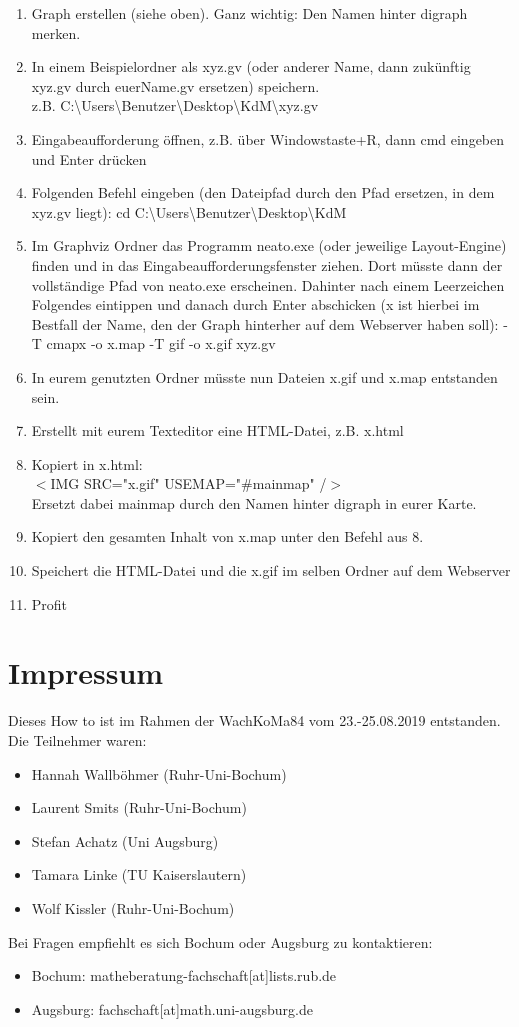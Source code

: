 \documentclass{article}
\begin{document}
\begin{enumerate}
\item Graph erstellen (siehe oben). Ganz wichtig: Den Namen hinter digraph merken.
\item In einem Beispielordner als xyz.gv (oder anderer Name, dann zukünftig xyz.gv durch euerName.gv ersetzen) speichern.\\
z.B. C:\textbackslash Users\textbackslash Benutzer\textbackslash Desktop\textbackslash KdM\textbackslash xyz.gv
\item Eingabeaufforderung öffnen, z.B. über Windowstaste+R, dann cmd eingeben und Enter drücken
\item Folgenden Befehl eingeben (den Dateipfad durch den Pfad ersetzen, in dem xyz.gv liegt): cd C:\textbackslash Users\textbackslash Benutzer\textbackslash Desktop\textbackslash KdM
\item Im Graphviz Ordner das Programm neato.exe (oder jeweilige Layout-Engine) finden und in das Eingabeaufforderungsfenster ziehen. Dort müsste dann der vollständige Pfad von neato.exe erscheinen. Dahinter nach einem Leerzeichen Folgendes eintippen und danach durch Enter abschicken (x ist hierbei im Bestfall der Name, den der Graph hinterher auf dem Webserver haben soll): -T cmapx -o x.map -T gif -o x.gif xyz.gv
\item In eurem genutzten Ordner müsste nun Dateien x.gif und x.map entstanden sein.
\item Erstellt mit eurem Texteditor eine HTML-Datei, z.B. x.html
\item Kopiert in x.html:\\
$<$IMG SRC="x.gif" USEMAP="\#mainmap" /$>$\\
Ersetzt dabei mainmap durch den Namen hinter digraph in eurer Karte.
\item Kopiert den gesamten Inhalt von x.map unter den Befehl aus 8.
\item Speichert die HTML-Datei und die x.gif im selben Ordner auf dem Webserver
\item Profit
\end{enumerate}
\section{Impressum}
Dieses How to ist im Rahmen der WachKoMa84 vom 23.-25.08.2019 entstanden.\\
Die Teilnehmer waren:
\begin{itemize}
    \item Hannah Wallböhmer (Ruhr-Uni-Bochum)
    \item Laurent Smits (Ruhr-Uni-Bochum)
    \item Stefan Achatz (Uni Augsburg)
    \item Tamara Linke (TU Kaiserslautern)
    \item Wolf Kissler (Ruhr-Uni-Bochum)
\end{itemize}
Bei Fragen empfiehlt es sich Bochum oder Augsburg zu kontaktieren:
\begin{itemize}
    \item Bochum: matheberatung-fachschaft[at]lists.rub.de
    \item Augsburg: fachschaft[at]math.uni-augsburg.de
\end{itemize}
\end{document}
